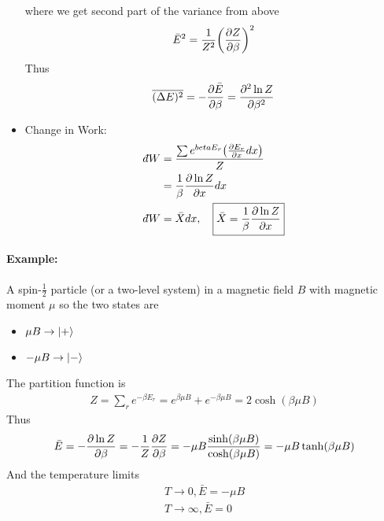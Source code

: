 \documentclass[../main.tex]{subfiles}
\begin{document}
\begin{itemize}
    where we get second part of the variance from above
    \begin{align*}
        \bar E^2 = \frac{1}{Z^2} \qt(\pdv{Z}{\beta})^2
    \end{align*}
    Thus
    \begin{align*}
        \overline{(\Delta E)^2} = -\pdv{\bar E}{\beta} = \pdv[2]{\ln Z}{\beta}
    \end{align*}
    \item Change in Work:
    \begin{align*}
        \dbar W &= \frac{\sum e^{\-beta E_r} \qt(\pdv{E_r}{x} dx)}{Z} \\
        &= \frac{1}{\beta} \pdv{\ln Z}{x} dx \\
        \dbar W &= \bar X dx, \quad \boxed{\bar X = \frac{1}{\beta} \pdv{\ln Z}{x}}
    \end{align*}
\end{itemize}

\paragraph{Example:} A spin-$\frac{1}{2}$ particle (or a two-level system) in a magnetic field $B$ with magnetic moment $\mu$ so the two states are
\begin{itemize}
    \item $\mu B \to \ket{+}$
    \item $-\mu B \to \ket{-}$
\end{itemize}
The partition function is
\begin{align*}
    Z = \sum_r e^{-\beta E_r} = e^{\beta \mu B} + e^{-\beta \mu B} = 2\cosh(\beta \mu B)
\end{align*}
Thus
\begin{align*}
    \bar E = -\pdv{\ln Z}{\beta} = -\frac{1}{Z} \pdv{Z}{\beta} = -\mu B \frac{\sinh(\beta \mu B)}{\cosh(\beta \mu B)} = -\mu B \tanh(\beta \mu B)
\end{align*}
And the temperature limits
\begin{align*}
    T \to 0, \bar E = -\mu B \\
    T \to \infty, \bar E = 0
\end{align*}
\end{document}
